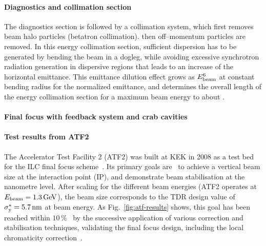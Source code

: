 \paragraph{Diagnostics and collimation section}
The diagnostics section is followed by a collimation system, which first removes beam halo particles (betatron collimation). 
then off--momentum particles are removed.
In this energy collimation section, sufficient dispersion has to be generated by bending the beam in a dogleg, while avoiding excessive synchrotron radiation generation in dispersive regions that leads to an increase of the horizontal emittance.
This emittance dilution effect grows as $E_{\mathrm{beam}}^6$ at constant bending radius for the normalized emittance, and determines the overall length of the energy collimation section for a maximum  beam energy to about .




\paragraph {Final focus with feedback system and crab cavities}



\paragraph {Test results from ATF2}
The Accelerator Test Facility 2 (ATF2) was built at KEK in 2008 as a test bed for the ILC final focus scheme~\cite[Sec. 3.6]{Adolphsen:2013jya}.
Its primary goals are~\cite{Grishanov:2005ek,Grishanov:2006kx} to achieve a  vertical beam size at the interaction point (IP), and demonstrate beam stabilisation at the nanometre level.
After scaling for the different beam energies (ATF2 operates at $E_{\mathrm{beam}}=1.3\,{\mathrm{GeV}}$), the  beam size corresponds to the TDR design value of $\sigma_{\mathrm{y}}^* = 5.7\,{\mathrm{nm}}$ at  beam energy.
As Fig.~\ref{fig:atf-results} shows, this goal has been reached within $10\,\%$~\cite{Okugi:2017jji} by the successive application of various correction and stabilisation techniques, 
validating the final focus design, including the local chromaticity correction~\cite{White:2014vwa}.

